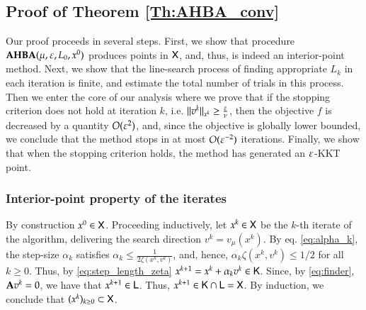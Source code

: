 \subsection{Proof of Theorem \ref{Th:AHBA_conv}}
\label{sec:ProofFOM}
Our proof proceeds in several steps. First, we show that procedure $\operatorname{\mathbf{AHBA}}(\mu,\varepsilon,L_{0},x^{0})$ produces points in $\mathsf{X}$, and, thus, is indeed an interior-point method. Next, we show that the line-search process of finding appropriate $L_k$ in each iteration is finite, and estimate the total number of trials in this process. Then we enter the core of our analysis where we prove that if the stopping criterion does not hold at iteration $k$, i.e. $\lVert v^{k}\rVert_{x^{k}} \geq \tfrac{\varepsilon}{\nu}$, then the objective $f$ is decreased by a quantity $O(\varepsilon^{2})$, and, since the objective is globally lower bounded, we conclude that the method stops in at most $O(\varepsilon^{-2})$ iterations. Finally, we show that when the stopping criterion holds, the method has generated an $\varepsilon$-KKT point. 

\subsubsection{Interior-point property of the iterates}
\label{S:FO_correct}
By construction $x^{0}\in\mathsf{X}$. Proceeding inductively, let $x^{k}\in\mathsf{X}$ be the $k$-th iterate of the algorithm, delivering the search direction $v^{k}=v_{\mu}(x^{k})$. 
By eq. \eqref{eq:alpha_k}, the step-size $\alpha_k$ satisfies $\alpha_{k}\leq \frac{1}{2\zeta(x^{k},v^{k})}$, and, hence, $\alpha_{k}\zeta(x^{k},v^{k})\leq 1/2$ for all $k\geq 0$. 
Thus, by \eqref{eq:step_length_zeta} $x^{k+1}=x^{k}+\alpha_{k}v^{k} \in\mathsf{K}$. Since, by \eqref{eq:finder}, ${\mathbf A} v^{k} =0$, we have that $x^{k+1} \in \mathsf{L}$. Thus, $x^{k+1}\in\mathsf{K} \cap \mathsf{L}=\mathsf{X}$. By induction, we conclude that $(x^{k})_{k\geq 0}\subset\mathsf{X}$. 

